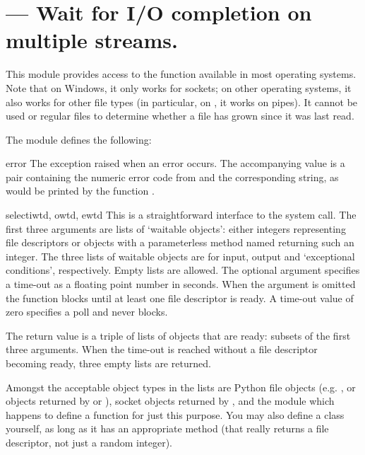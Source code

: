 \section{ ---
         Wait for I/O completion on multiple streams.}



This module provides access to the function 
available in most operating systems.  Note that on Windows, it only
works for sockets; on other operating systems, it also works for other
file types (in particular, on \UNIX{}, it works on pipes).  It cannot
be used or regular files to determine whether a file has grown since
it was last read.

The module defines the following:

\begin{excdesc}{error}
The exception raised when an error occurs.  The accompanying value is
a pair containing the numeric error code from  and the
corresponding string, as would be printed by the \C{} function
.
\end{excdesc}

\begin{funcdesc}{select}{iwtd, owtd, ewtd}
This is a straightforward interface to the \UNIX{} 
system call.  The first three arguments are lists of `waitable
objects': either integers representing \UNIX{} file descriptors or
objects with a parameterless method named  returning
such an integer.  The three lists of waitable objects are for input,
output and `exceptional conditions', respectively.  Empty lists are
allowed.  The optional  argument specifies a time-out as a
floating point number in seconds.  When the  argument
is omitted the function blocks until at least one file descriptor is
ready.  A time-out value of zero specifies a poll and never blocks.

The return value is a triple of lists of objects that are ready:
subsets of the first three arguments.  When the time-out is reached
without a file descriptor becoming ready, three empty lists are
returned.

Amongst the acceptable object types in the lists are Python file
objects (e.g. , or objects returned by
 or ), socket objects
returned by ,%
and the module  which happens to
define a function %
for just this purpose.  You may
also define a  class yourself, as long as it has an
appropriate  method (that really returns a \UNIX{}
file descriptor, not just a random integer).
\end{funcdesc}
